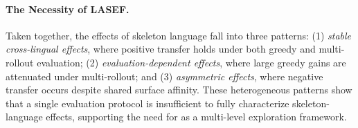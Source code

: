 \paragraph{The Necessity of LASEF.}
Taken together, the effects of skeleton language fall into three patterns: (1) \textit{stable cross-lingual effects}, where positive transfer holds under both greedy and multi-rollout evaluation; (2) \textit{evaluation-dependent effects}, where large greedy gains are attenuated under multi-rollout; and (3) \textit{asymmetric effects}, where negative transfer occurs despite shared surface affinity. These heterogeneous patterns show that a single evaluation protocol is insufficient to fully characterize skeleton-language effects, supporting the need for \LASEF as a multi-level exploration framework.